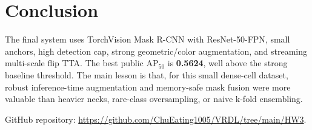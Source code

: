\documentclass[10pt,twocolumn,letterpaper]{article}
\begin{document}
\section{Conclusion}
\label{sec:conclusion}

The final system uses TorchVision Mask R-CNN with ResNet-50-FPN, small anchors, high detection cap, strong geometric/color augmentation, and streaming multi-scale flip TTA. The best public AP$_{50}$ is \textbf{0.5624}, well above the strong baseline threshold. The main lesson is that, for this small dense-cell dataset, robust inference-time augmentation and memory-safe mask fusion were more valuable than heavier necks, rare-class oversampling, or naive k-fold ensembling.

GitHub repository: \url{https://github.com/ChuEating1005/VRDL/tree/main/HW3}.

{\small
  
  
}
\end{document}
